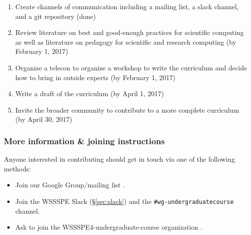 \begin{enumerate}
\item Create channels of communication including a mailing list, a
  slack channel, and a git repository (done)
\item Review literature on best and good-enough practices for
  scientific computing as well as literature on pedagogy for
  scientific and research computing (by February 1, 2017)
\item Organize a telecon to organize a workshop to write the
  curriculum and decide how to bring in outside experts (by February 1,
  2017)
\item Write a draft of the curriculum (by April 1, 2017)
\item Invite the broader community to contribute to a more complete
  curriculum (by April 30, 2017)
\end{enumerate}

\subsubsection{More information \& joining instructions}

Anyone interested in contributing should get in touch via one of the
following methods:

\begin{itemize}
\item Join our Google Group/mailing list
  \cite{WSSSPEUndergradGoogleGroup}.
\item Join the WSSSPE Slack (\S\ref{sec:slack}) and the
  \texttt{\#wg-undergraduatecourse} channel.
\item Ask to join the WSSSPE4-undergraduate-course organization
  \cite{WSSSPEUndergradGithub}.
\end{itemize}
